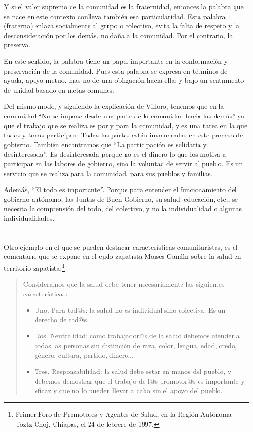 \documentclass[oneside]{book}
\begin{document}
Y si el valor supremo de la comunidad es la fraternidad, entonces la palabra que se nace en este contexto conlleva también esa particularidad. Esta palabra (fraterna) enlaza socialmente al grupo o colectivo, evita la falta de respeto y la desconsideración por los demás, no daña a la comunidad. Por el contrario, la preserva. 

En este sentido, la palabra tiene un papel importante en la conformación y preservación de la comunidad. Pues esta palabra se expresa en términos de ayuda, apoyo mutuo, mas no de una obligación hacia ella; y bajo un sentimiento de unidad basado en metas comunes.

Del mismo modo, y siguiendo la explicación de Villoro, tenemos que en la comunidad “No se impone desde una parte de la comunidad hacia las demás” ya que el trabajo que se realiza es por y para la comunidad, y es una tarea en la que todos y todas participan. Todas las partes están involucradas en este proceso de gobierno. También encontramos que “La participación es solidaria y desinteresada”. Es desinteresada porque no es el dinero lo que los motiva a participar en las labores de gobierno, sino la voluntad de servir al pueblo. Es un servicio que se realiza para la comunidad, para sus pueblos y familias.

Además, “El todo es importante”. Porque para entender el funcionamiento del gobierno autónomo, las Juntas de Buen Gobierno, su salud, educación, etc., se necesita la comprensión del todo, del colectivo, y no la individualidad o algunas individualidades.
\\
\\
\\

Otro ejemplo en el que se pueden destacar características comunitaristas, es el comentario que se expone en el ejido zapatista Moisés Gandhi sobre la salud en territorio zapatista:\footnote{Primer Foro de Promotores y Agentes de Salud, en la Región Autónoma Toztz Choj, Chiapas, el 24 de febrero de 1997.} 
\begin{quote}
Consideramos que la salud debe tener necesariamente las siguientes características:
\begin{itemize}
	\item Uno. Para tod@s: la salud no es individual sino colectiva. Es un derecho de tod@s.
	\item Dos. Neutralidad: como trabajador@s de la salud debemos atender a todas las personas sin distinción de raza, color, lengua, edad, credo, género, cultura, partido, dinero...
	\item Tres. Responsabilidad: la salud debe estar en manos del pueblo, y debemos demostrar que el trabajo de l@s promotor@s es importante y eficaz y que no lo pueden llevar a cabo sin el apoyo del pueblo.
\end{itemize}
\end{quote}
	
\end{document}
